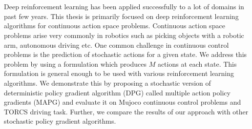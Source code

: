 \chapter{\abstractname}

Deep reinforcement learning has been applied successfully to a lot of domains in past few years. This thesis is primarily focused on deep reinforcement learning algorithms for continuous action space problems. Continuous action space problems arise very commonly in robotics such as picking objects with a robotic arm, autonomous driving etc. One common challenge in continuous control problems is the prediction of stochastic actions for a given state. We address this problem by using a formulation which produces $M$ actions at each state. This formulation is general enough to be used with various reinforcement learning algorithms. We demonstrate this by proposing a stochastic version of deterministic policy gradient algorithm (DPG) called multiple action policy gradients (MAPG) and evaluate it on Mujoco continuous control problems and TORCS driving task. Further, we compare the results of our approach with other stochastic policy gradient algorithms.





